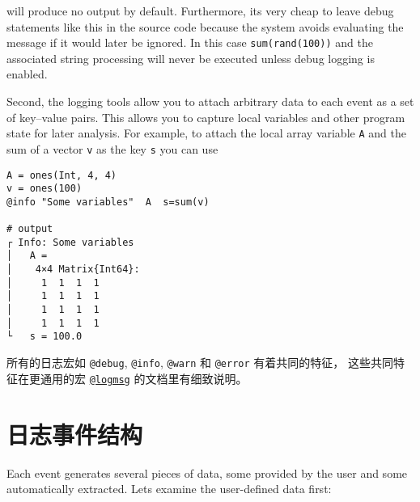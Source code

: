 will produce no output by default.  Furthermore, it{\textquotesingle}s very cheap to leave debug statements like this in the source code because the system avoids evaluating the message if it would later be ignored.  In this case \texttt{sum(rand(100))} and the associated string processing will never be executed unless debug logging is enabled.



Second, the logging tools allow you to attach arbitrary data to each event as a set of key–value pairs. This allows you to capture local variables and other program state for later analysis. For example, to attach the local array variable \texttt{A} and the sum of a vector \texttt{v} as the key \texttt{s} you can use




\begin{verbatim}
A = ones(Int, 4, 4)
v = ones(100)
@info "Some variables"  A  s=sum(v)

# output
┌ Info: Some variables
│   A =
│    4×4 Matrix{Int64}:
│     1  1  1  1
│     1  1  1  1
│     1  1  1  1
│     1  1  1  1
└   s = 100.0
\end{verbatim}



所有的日志宏如 \texttt{@debug}, \texttt{@info}, \texttt{@warn} 和 \texttt{@error} 有着共同的特征， 这些共同特征在更通用的宏 \hyperlink{2787319849348710857}{\texttt{@logmsg}} 的文档里有细致说明。



\hypertarget{16412881529124994328}{}


\section{日志事件结构}



Each event generates several pieces of data, some provided by the user and some automatically extracted. Let{\textquotesingle}s examine the user-defined data first:



